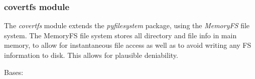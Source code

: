 \documentclass[letterpaper,10pt,english]{sphinxmanual}
\begin{document}
\subsubsection{covertfs module}
\label{File_System:covertfs-module}
The \emph{covertfs} module extends the \emph{pyfilesystem} package, using the \emph{MemoryFS} file system.
The MemoryFS file system stores all directory and file info in main memory, to allow for instantaneous file access as well as to avoid writing any FS information to disk. This allows for plausible deniability.
\label{File_System:module-File_System.covertfs}

\begin{fulllineitems}
\label{File_System:File_System.covertfs.CovertEntry}
Bases: 

\end{fulllineitems}

\end{document}
